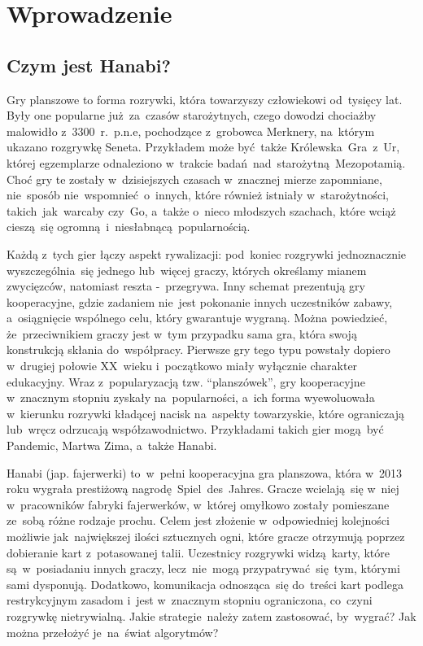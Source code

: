 \documentclass[declaration,shortabstract,inz]{iithesis}
\author         {Wojciech Jarząbek \and
				Jacek Leja}
\date          {\today}                     %
\begin{document}
\chapter{Wprowadzenie}

\section{Czym jest Hanabi?}

Gry planszowe to forma rozrywki, która towarzyszy człowiekowi od~tysięcy lat. Były one popularne już za~czasów starożytnych, czego dowodzi chociażby malowidło z~3300~r.~p.n.e, pochodzące z~grobowca Merknery, na~którym ukazano rozgrywkę Seneta. Przykładem może być także Królewska~Gra~z~Ur, której egzemplarze odnaleziono w~trakcie badań nad~starożytną Mezopotamią. Choć gry te zostały w~dzisiejszych czasach w~znacznej mierze zapomniane, nie~sposób nie~wspomnieć o~innych, które również istniały w~starożytności, takich~jak~warcaby czy~Go, a~także o~nieco młodszych szachach, które wciąż cieszą~się ogromną i~niesłabnącą popularnością.

Każdą z~tych gier łączy aspekt rywalizacji: pod~koniec rozgrywki jednoznacznie wyszczególnia~się jednego lub~więcej graczy, których określamy mianem zwycięzców, natomiast reszta -~przegrywa. Inny schemat prezentują gry kooperacyjne, gdzie zadaniem nie~jest pokonanie innych uczestników zabawy, a~osiągnięcie wspólnego celu, który gwarantuje wygraną. Można powiedzieć, że~przeciwnikiem graczy jest w~tym przypadku sama gra, która swoją konstrukcją skłania do~współpracy. Pierwsze gry tego typu powstały dopiero w~drugiej połowie XX~wieku i~początkowo miały wyłącznie charakter edukacyjny. Wraz z~popularyzacją tzw. ``planszówek'', gry kooperacyjne w~znacznym stopniu zyskały na~popularności, a~ich forma wyewoluowała w~kierunku rozrywki kładącej nacisk na~aspekty towarzyskie, które ograniczają lub~wręcz odrzucają współzawodnictwo. Przykładami takich gier mogą~być Pandemic, Martwa Zima, a~także Hanabi.

Hanabi (jap. fajerwerki) to~w~pełni kooperacyjna gra planszowa, która w~2013 roku wygrała prestiżową nagrodę Spiel~des~Jahres. Gracze wcielają~się w~niej w~pracowników fabryki fajerwerków, w~której omyłkowo zostały pomieszane ze~sobą różne rodzaje prochu. Celem jest złożenie w~odpowiedniej kolejności możliwie jak~największej ilości sztucznych ogni, które gracze otrzymują poprzez dobieranie kart z~potasowanej talii. Uczestnicy rozgrywki widzą karty, które są~w~posiadaniu innych graczy, lecz~nie~mogą przypatrywać~się~tym, którymi sami dysponują. Dodatkowo, komunikacja odnosząca~się do~treści kart podlega restrykcyjnym zasadom i~jest w~znacznym stopniu ograniczona, co~czyni rozgrywkę nietrywialną. Jakie strategie należy zatem zastosować, by~wygrać? Jak można przełożyć je~na~świat algorytmów?
\end{document}
